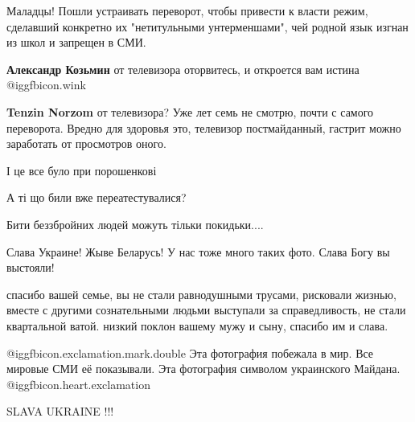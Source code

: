  
 
 
 
 


Маладцы! Пошли устраивать переворот, чтобы привести к власти режим, сделавший
конкретно их "нетитульными унтерменшами", чей родной язык изгнан из школ и
запрещен в СМИ.

\begin{itemize} %
\textbf{Александр Козьмин} от телевизора оторвитесь, и откроется вам истина @igg{fbicon.wink} 

\textbf{Tenzin Norzom} от телевизора? Уже лет семь не смотрю, почти с самого переворота. Вредно для здоровья это, телевизор постмайданный, гастрит можно заработать от просмотров оного.
\end{itemize} %

І це все було при порошенкові

А ті що били вже переатестувалися?

Бити беззбройних людей можуть тільки покидьки....

Слава Украине! Жыве Беларусь! У нас тоже много таких фото. Слава Богу вы выстояли!


спасибо вашей семье, вы не стали равнодушными трусами, рисковали жизнью, вместе с
другими сознательными людьми выступали за справедливость, не стали квартальной
ватой. низкий поклон вашему мужу и сыну, спасибо им и слава.


@igg{fbicon.exclamation.mark.double} 
Эта фотография побежала в мир. Все мировые СМИ её показывали. Эта фотография символом украинского Майдана.
@igg{fbicon.heart.exclamation}

SLAVA UKRAINE !!!
